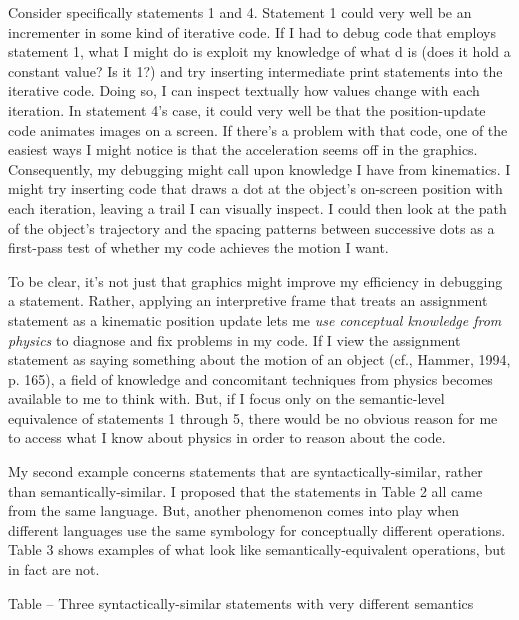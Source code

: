 Consider specifically statements 1 and 4. Statement 1 could very well be
an incrementer in some kind of iterative code. If I had to debug code
that employs statement 1, what I might do is exploit my knowledge of
what d is (does it hold a constant value? Is it 1?) and try inserting
intermediate print statements into the iterative code. Doing so, I can
inspect textually how values change with each iteration. In statement
4's case, it could very well be that the position-update code animates
images on a screen. If there's a problem with that code, one of the
easiest ways I might notice is that the acceleration seems off in the
graphics. Consequently, my debugging might call upon knowledge I have
from kinematics. I might try inserting code that draws a dot at the
object's on-screen position with each iteration, leaving a trail I can
visually inspect. I could then look at the path of the object's
trajectory and the spacing patterns between successive dots as a
first-pass test of whether my code achieves the motion I want.

To be clear, it's not just that graphics might improve my efficiency in
debugging a statement. Rather, applying an interpretive frame that
treats an assignment statement as a kinematic position update lets me
\emph{use conceptual knowledge from physics} to diagnose and fix
problems in my code. If I view the assignment statement as saying
something about the motion of an object (cf., Hammer, 1994, p. 165), a
field of knowledge and concomitant techniques from physics becomes
available to me to think with. But, if I focus only on the
semantic-level equivalence of statements 1 through 5, there would be no
obvious reason for me to access what I know about physics in order to
reason about the code.

My second example concerns statements that are syntactically-similar,
rather than semantically-similar. I proposed that the statements in
Table 2 all came from the same language. But, another phenomenon comes
into play when different languages use the same symbology for
conceptually different operations. Table 3 shows examples of what look
like semantically-equivalent operations, but in fact are not.

\protect\hypertarget{ux5fToc252445957}{}{}Table -- Three
syntactically-similar statements with very different semantics


